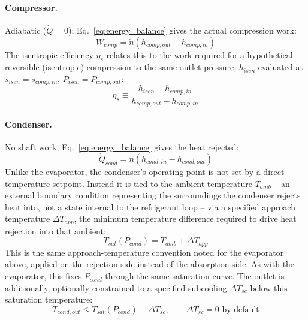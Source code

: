 \documentclass{article}
\begin{document}
\paragraph{Compressor.} Adiabatic ($\dot Q=0$); Eq.~\eqref{eq:energy_balance}
gives the actual compression work:
\begin{equation}\label{eq:w_comp}
    \dot W_{comp} = \dot n\left(h_{comp,out} - h_{comp,in}\right)
\end{equation}
The isentropic efficiency $\eta_s$ relates this to the work required for a
hypothetical reversible (isentropic) compression to the same outlet
pressure, $h_{isen}$ evaluated at $s_{isen}=s_{comp,in}$, $P_{isen}=P_{comp,out}$:
\begin{equation}\label{eq:eta_isen}
    \eta_s \equiv \frac{h_{isen} - h_{comp,in}}{h_{comp,out} - h_{comp,in}}
\end{equation}

\paragraph{Condenser.} No shaft work; Eq.~\eqref{eq:energy_balance} gives the
heat rejected:
\begin{equation}\label{eq:q_cond}
    \dot Q_{cond} = \dot n\left(h_{cond,in} - h_{cond,out}\right)
\end{equation}
Unlike the evaporator, the condenser's operating point is not set by a
direct temperature setpoint. Instead it is tied to the ambient
temperature $T_{amb}$ -- an external boundary condition representing the
surroundings the condenser rejects heat into, not a state internal to the
refrigerant loop -- via a specified approach temperature $\Delta T_{app}$,
the minimum temperature difference required to drive heat rejection into
that ambient:
\begin{equation}\label{eq:subcool_approach}
    T_{sat}(P_{cond}) = T_{amb} + \Delta T_{app}
\end{equation}
This is the same approach-temperature convention noted for the evaporator
above, applied on the rejection side instead of the absorption side. As
with the evaporator, this fixes $P_{cond}$ through the same saturation
curve. The outlet is additionally, optionally constrained to a specified
subcooling $\Delta T_{sc}$ below this saturation temperature:
\begin{equation}\label{eq:subcool}
    T_{cond,out} \le T_{sat}(P_{cond}) - \Delta T_{sc}, \qquad \Delta T_{sc}=0 \text{ by default}
\end{equation}
\end{document}
